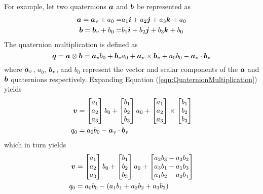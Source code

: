 For example, let two quaternions $\boldsymbol{a}$ and $\boldsymbol{b}$ be represented as
\begin{subequations}
\begin{align}
  \boldsymbol{a} = \boldsymbol{a}_v + a_0 = & a_1 \boldsymbol{i} + a_2 \boldsymbol{j} + a_3 \boldsymbol{k} + a_0\\
  \boldsymbol{b} = \boldsymbol{b}_v + b_0 = & b_1 \boldsymbol{i} + b_2 \boldsymbol{j} + b_3 \boldsymbol{k} + b_0
\end{align}
\end{subequations}
The quaternion multiplication is defined as
\begin{equation}
  \boldsymbol{q} = \boldsymbol{a} \otimes \boldsymbol{b} = \boldsymbol{a}_v b_0 + \boldsymbol{b}_v a_0 + \boldsymbol{a}_v \times \boldsymbol{b}_v + a_0 b_0 - \boldsymbol{a}_v \cdot \boldsymbol{b}_v
  \label{eqn:QuaternionMultiplication}
\end{equation}
where $\boldsymbol{a}_v$, $a_0$, $\boldsymbol{b}_v$, and $b_0$ represent the vector and scalar components of the $\boldsymbol{a}$ and $\boldsymbol{b}$ quaternions respectively.  Expanding Equation (\ref{eqn:QuaternionMultiplication}) yields
\begin{subequations}
\begin{align}
  \boldsymbol{v} & = \begin{bmatrix} a_1 \\ a_2 \\ a_3 \end{bmatrix} b_0 +\begin{bmatrix} b_1 \\ b_2 \\ b_3 \end{bmatrix} a_0 + \begin{bmatrix} a_1 \\ a_2 \\ a_3 \end{bmatrix} \times \begin{bmatrix} b_1 \\ b_2 \\ b_3 \end{bmatrix} \\
  q_0 & = a_0 b_0 - \boldsymbol{a}_v \cdot \boldsymbol{b}_v
\end{align}
\end{subequations}
which in turn yields
\begin{subequations}
\begin{align}
  \boldsymbol{v} & = \begin{bmatrix} a_1 \\ a_2 \\ a_3 \end{bmatrix} b_0 +\begin{bmatrix} b_1 \\ b_2 \\ b_3 \end{bmatrix} a_0 + \begin{bmatrix} a_2b_3 - a_3b_2 \\ a_3b_1 - a_1b_3 \\ a_1b_2 - a_2b_1 \\ \end{bmatrix} \\
  q_0 & = a_0 b_0 - (a_1b_1 + a_2b_2 + a_3b_3)
\end{align}
\end{subequations}
